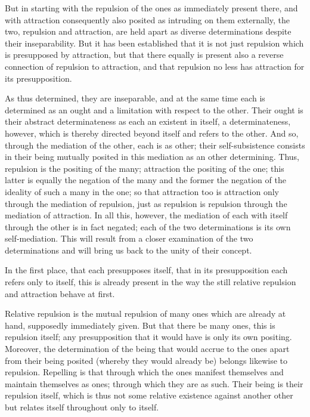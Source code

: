 But in starting with the repulsion
of the ones as immediately present there,
and with attraction consequently also posited
as intruding on them externally,
the two, repulsion and attraction,
are held apart as diverse
determinations despite their inseparability.
But it has been established that it is not
just repulsion which is presupposed by attraction,
but that there equally is present also
a reverse connection of repulsion to attraction,
and that repulsion no less has
attraction for its presupposition.

As thus determined, they are inseparable,
and at the same time each is determined
as an ought and a limitation with respect to the other.
Their ought is their abstract determinateness
as each an existent in itself,
a determinateness, however, which is thereby
directed beyond itself and refers to the other.
And so, through the mediation of the other, each is as other;
their self-subsistence consists in their being mutually posited
in this mediation as an other determining.
Thus, repulsion is the positing of the many;
attraction the positing of the one;
this latter is equally the negation of the many
and the former the negation of the ideality
of such a many in the one;
so that attraction too is attraction only through
the mediation of repulsion,
just as repulsion is repulsion
through the mediation of attraction.
In all this, however, the mediation of each with itself
through the other is in fact negated;
each of the two determinations is its own self-mediation.
This will result from a closer examination of the two determinations
and will bring us back to the unity of their concept.

In the first place, that each presupposes itself,
that in its presupposition each refers only to itself,
this is already present in the way the still relative
repulsion and attraction behave at first.

Relative repulsion is the mutual repulsion
of many ones which are already at hand,
supposedly immediately given.
But that there be many ones,
this is repulsion itself;
any presupposition that it would have is
only its own positing.
Moreover, the determination of the being
that would accrue to the ones
apart from their being posited
(whereby they would already be)
belongs likewise to repulsion.
Repelling is that through which
the ones manifest themselves
and maintain themselves as ones;
through which they are as such.
Their being is their repulsion itself,
which is thus not some relative
existence against another other
but relates itself throughout only to itself.

